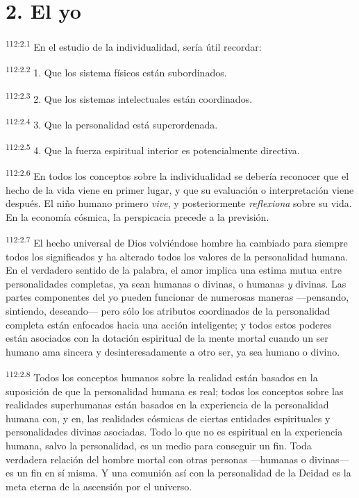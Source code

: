 \section*{2. El yo}
\par
\textsuperscript{112:2.1} En el estudio de la individualidad, sería útil recordar:

\par
\textsuperscript{112:2.2} 1. Que los sistema físicos están subordinados.

\par
\textsuperscript{112:2.3} 2. Que los sistemas intelectuales están coordinados.

\par
\textsuperscript{112:2.4} 3. Que la personalidad está superordenada.

\par
\textsuperscript{112:2.5} 4. Que la fuerza espiritual interior es potencialmente directiva.

\par
\textsuperscript{112:2.6} En todos los conceptos sobre la individualidad se debería reconocer que el hecho de la vida viene en primer lugar, y que su evaluación o interpretación viene después. El niño humano primero \textit{vive}, y posteriormente \textit{reflexiona} sobre su vida. En la economía cósmica, la perspicacia precede a la previsión.

\par
\textsuperscript{112:2.7} El hecho universal de Dios volviéndose hombre ha cambiado para siempre todos los significados y ha alterado todos los valores de la personalidad humana. En el verdadero sentido de la palabra, el amor implica una estima mutua entre personalidades completas, ya sean humanas o divinas, o humanas \textit{y} divinas. Las partes componentes del yo pueden funcionar de numerosas maneras ---pensando, sintiendo, deseando--- pero sólo los atributos coordinados de la personalidad completa están enfocados hacia una acción inteligente; y todos estos poderes están asociados con la dotación espiritual de la mente mortal cuando un ser humano ama sincera y desinteresadamente a otro ser, ya sea humano o divino.

\par
\textsuperscript{112:2.8} Todos los conceptos humanos sobre la realidad están basados en la suposición de que la personalidad humana es real; todos los conceptos sobre las realidades superhumanas están basados en la experiencia de la personalidad humana con, y en, las realidades cósmicas de ciertas entidades espirituales y personalidades divinas asociadas. Todo lo que no es espiritual en la experiencia humana, salvo la personalidad, es un medio para conseguir un fin. Toda verdadera relación del hombre mortal con otras personas ---humanas o divinas--- es un fin en sí misma. Y una comunión así con la personalidad de la Deidad es la meta eterna de la ascensión por el universo.

